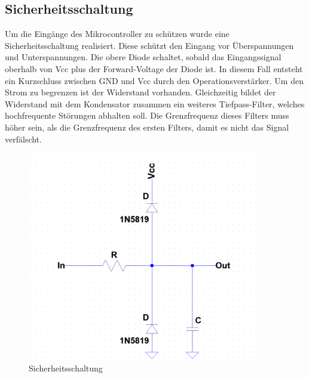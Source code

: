 \subsection{Sicherheitsschaltung}
\begin{minipage}[h]{0.5\textwidth} 
Um die Eingänge des Mikrocontroller zu schützen wurde eine Sicherheitsschaltung realisiert. Diese schützt den Eingang vor Überspannungen und Unterspannungen. Die obere Diode schaltet, sobald das Eingangssignal oberhalb von Vcc plus der Forward-Voltage der Diode ist. In diesem Fall entsteht ein Kurzschluss zwischen GND und Vcc durch den Operationsverstärker. Um den Strom zu begrenzen ist der Widerstand vorhanden. Gleichzeitig bildet der Widerstand mit dem Kondensator zusammen ein weiteres Tiefpass-Filter, welches hochfrequente Störungen abhalten soll.  Die Grenzfrequenz dieses Filters muss höher sein, als die Grenzfrequenz des ersten Filters, damit es nicht das Signal verfälscht.
\end{minipage}
\begin{minipage}[h]{0.5\textwidth} 
\begin{figure}[H]
\begin{center}
\includegraphics[width=0.9\textwidth]{images/Analoge_Schaltung_Sicherung.png}
\caption{Sicherheitsschaltung}
\end{center}
\end{figure}
\end{minipage}

